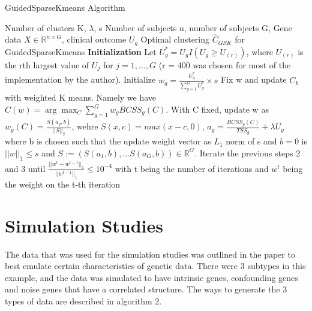 \documentclass{statsoc}
\newcommand{\RR}{\mathbb{R}}
\begin{document}
\begin{algorithm}
    \caption{GuidedSparseKmeans Algorithm}
    \begin{algorithmic}[1]
        \REQUIRE Number of clusters K, $\lambda$, s
        \INPUT Number of subjects n, number of subjects G, Gene data $X \in \RR^{n\times G}$, clinical outcome $U_g$
        \OUTPUT Optimal clustering $\hat{C}_{GSK}$ for GuidedSparseKmeans
        \STATE \textbf{Initialization} Let $U_g^* = U_g I(U_g \geq U_{(r)})$, where $U_{(r)}$ is the rth largest value of $U_j$ for $j = 1,\ldots, G$ (r = 400 was chosen for most of the implementation by the author). Initialize $w_g = \frac{U_g^*}{\sum_{g=1}^G U_g^*} \times s$
        \STATE Fix w and update $C_k$ with weighted K means. Namely we have $C(w) = \arg \max_C \sum_{g=1}^G w_g BCSS_g(C)$. 
        \STATE With C fixed, update w as $w_g(C) = \frac{S(a_g, b)}{||S||_2}$, wehre $S(x,c) = max(x-c, 0)$, $a_g = \frac{BCSS_g(C)}{TSS_g} + \lambda U_g$ where b is chosen such that the update weight vector as $L_1$ norm of s and $b=0$ is $||w||_1 \leq s$ and $S := (S(a_1,b), \ldots S(a_G, b)) \in \RR^G$. 
        \STATE Iterate the previous steps 2 and 3 until $\frac{||w^t - w^{t-1}||_1}{||w^{t-1}||_1} \leq 10^{-4}$ with t being the number of iterations and $w^t$ being the weight on the t-th iteration   
    \end{algorithmic}
\end{algorithm}


\section{Simulation Studies}

The data that was used for the simulation studies was outlined in the paper to best emulate certain characteristics of genetic data. There were 3 subtypes in this example, and the data was simulated to have intrinsic genes, confounding genes and noise genes that have a correlated structure. The ways to generate the 3 types of data are described in algorithm 2. 
\end{document}
